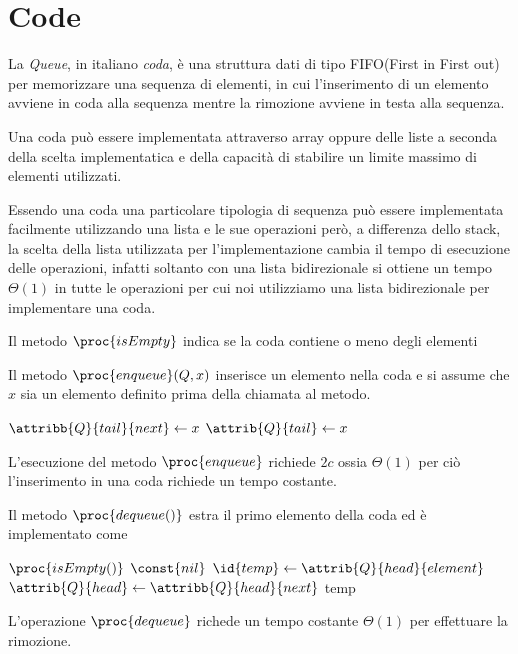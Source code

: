 \section{Code}
La \emph{Queue}, in italiano \emph{coda}, è una struttura dati di tipo FIFO(First in First out)
per memorizzare una sequenza di elementi, in cui l'inserimento di un elemento
avviene in coda alla sequenza mentre la rimozione avviene in testa alla sequenza.

Una coda può essere implementata attraverso array oppure delle liste a seconda della
scelta implementatica e della capacità di stabilire un limite massimo di elementi utilizzati.

Essendo una coda una particolare tipologia di sequenza può essere implementata facilmente
utilizzando una lista e le sue operazioni però, a differenza dello stack, la scelta
della lista utilizzata per l'implementazione cambia il tempo di esecuzione delle operazioni,
infatti soltanto con una lista bidirezionale si ottiene un tempo $\Theta(1)$ in tutte le operazioni
per cui noi utilizziamo una lista bidirezionale per implementare una coda.

Il metodo $\proc{isEmpty}$ indica se la coda contiene o meno degli elementi
\begin{codebox}
\li \Return 
\end{codebox}
Il metodo $\proc{enqueue}(Q,x)$ inserisce un elemento nella coda e si assume che $x$ sia un elemento
definito prima della chiamata al metodo.
\begin{codebox}
\li $\attribb{Q}{tail}{next} \gets x$
\li $\attrib{Q}{tail} \gets x$
\end{codebox}
L'esecuzione del metodo $\proc{enqueue}$ richiede $2c$ ossia $\Theta(1)$ per ciò
l'inserimento in una coda richiede un tempo costante.

Il metodo $\proc{dequeue()}$ estra il primo elemento della coda ed è implementato come
\begin{codebox}
\li \If $\proc{isEmpty()}$
    \Then
\li           \Return $\const{nil}$
\li $\id{temp} \gets \attrib{Q}{head}{element}$
\li $\attrib{Q}{head} \gets \attribb{Q}{head}{next}$
\li \Return temp
\end{codebox}
L'operazione $\proc{dequeue}$ richede un tempo costante $\Theta(1)$ per effettuare la rimozione.

